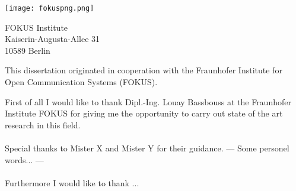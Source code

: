 \thispagestyle{empty}
\vspace*{3cm}


\begin{center}
\texttt{[image: fokuspng.png]}
\end{center}

\vspace*{0.2cm}

\begin{center}
FOKUS Institute\\
Kaiserin-Augusta-Allee 31\\
10589 Berlin\\
\end{center}
\vspace*{0.5cm}

\noindent This dissertation originated in cooperation with the Fraunhofer Institute for Open Communication Systems (FOKUS).

\vspace*{1cm}
\noindent
First of all I would like to thank Dipl.-Ing. Louay Bassbouss at the Fraunhofer Institute
FOKUS for giving me the opportunity to carry out state of the art research in this field.
\\
\\
Special thanks to Mister X and Mister Y for their guidance. --- Some personel words... ---
\\
\\
Furthermore I would like to thank ...
